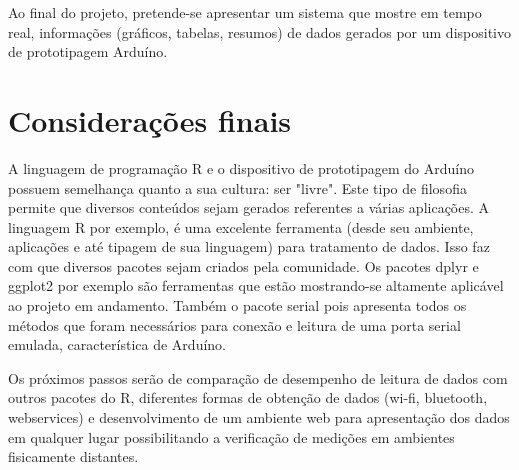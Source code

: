 \documentclass[
	article,			%
	11pt,				%
	oneside,			%
	a4paper,			%
	english,			%
	brazil,				%
	sumario=tradicional
	]{abntex2}
\begin{document}
Ao final do projeto, pretende-se apresentar um sistema que mostre em tempo real, 
informações (gráficos, tabelas, resumos) de dados gerados por um dispositivo de 
prototipagem Arduíno.



% 

\section*{Considerações finais}

A linguagem de programação R e o dispositivo de prototipagem do Arduíno possuem semelhança quanto a sua cultura: ser "livre". 
Este tipo de filosofia permite que diversos conteúdos sejam gerados referentes a várias aplicações. A linguagem R por exemplo, é uma excelente ferramenta (desde seu ambiente, aplicações e até tipagem de sua linguagem) para tratamento de dados. Isso faz com que diversos pacotes sejam criados pela comunidade. Os pacotes dplyr e ggplot2 por exemplo são ferramentas que estão mostrando-se altamente aplicável ao projeto em andamento. Também o pacote serial pois apresenta todos os métodos que foram necessários para conexão e leitura de uma porta serial emulada, característica de Arduíno.

Os próximos passos serão de comparação de desempenho de leitura de dados com outros pacotes do R, diferentes formas de obtenção de dados (wi-fi, bluetooth, webservices) e desenvolvimento de um ambiente web para apresentação dos dados em qualquer lugar possibilitando a verificação de medições em ambientes fisicamente distantes.









\end{document}
